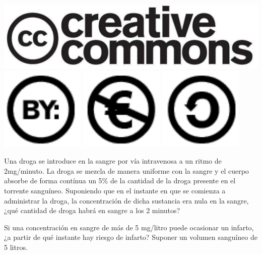 \documentclass[aspectratio=149,10pt,xcolor=dvipsnames,t]{beamer}
\begin{document}
\begin{frame}[c]
\begin{center}
\biskip
\includegraphics[scale=0.07]{img/cc-logo}
\includegraphics[scale=0.2]{img/cc-by}
\includegraphics[scale=0.2]{img/cc-e}
\includegraphics[scale=0.2]{img/cc-c}
\end{center}
\end{frame}

\begin{frame}[c]
Una droga se introduce en la sangre por vía intravenosa a un ritmo de 2mg/minuto. La droga se mezcla de
manera uniforme con la sangre y el cuerpo absorbe de forma contínua un 5\% de la cantidad de la droga presente en el torrente
sanguíneo. Suponiendo que en el instante en  que se comienza a administrar la droga, la concentración de dicha sustancia
era nula en la sangre, ¿qué cantidad de droga habrá en sangre a los 2 minutos? 

Si una concentración en sangre de más de 5 mg/litro puede ocasionar un infarto, ¿a partir de qué instante hay riesgo de
infarto? Suponer un volumen sanguíneo de 5 litros.
\end{frame}
\end{document}
